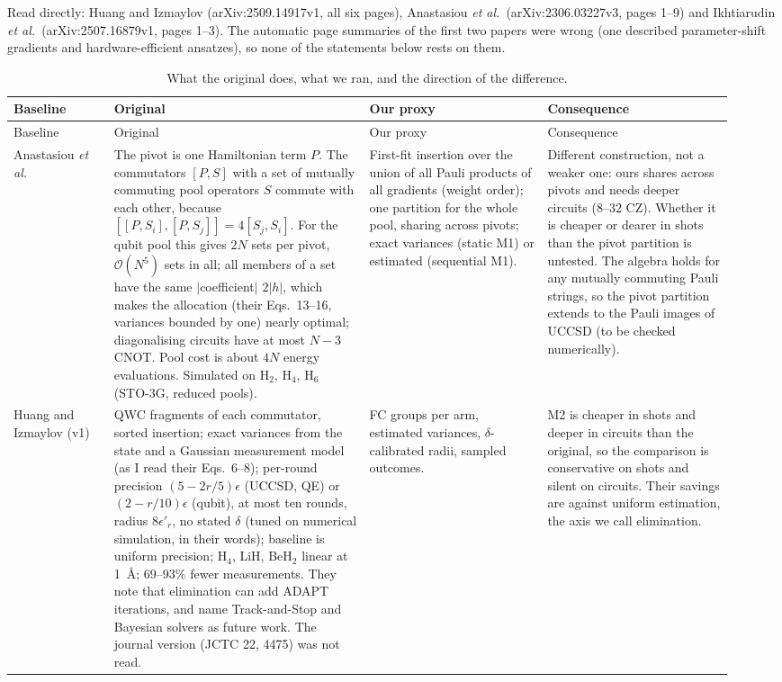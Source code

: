 \documentclass[11pt]{article}
\newcommand{\Hfour}{H$_4$}
\begin{document}
Read directly: Huang and Izmaylov (arXiv:2509.14917v1, all six pages), Anastasiou \emph{et al.}\ (arXiv:2306.03227v3, pages 1--9) and Ikhtiarudin \emph{et al.}\ (arXiv:2507.16879v1, pages 1--3). The automatic page summaries of the first two papers were wrong (one described parameter-shift gradients and hardware-efficient ansatzes), so none of the statements below rests on them.

\begingroup\small
\setlength{\tabcolsep}{4pt}
\begin{longtable}{>{\raggedright\arraybackslash}p{0.13\linewidth}>{\raggedright\arraybackslash}p{0.33\linewidth}>{\raggedright\arraybackslash}p{0.23\linewidth}>{\raggedright\arraybackslash}p{0.24\linewidth}}
\caption{What the original does, what we ran, and the direction of the difference.\label{tab:audit}}\\
\toprule
Baseline & Original & Our proxy & Consequence \\
\midrule
\endfirsthead
\toprule
Baseline & Original & Our proxy & Consequence \\
\midrule
\endhead
Anastasiou \emph{et al.} & The pivot is one Hamiltonian term $P$. The commutators $[P,S]$ with a set of mutually commuting pool operators $S$ commute with each other, because $[[P,S_i],[P,S_j]]=4[S_j,S_i]$. For the qubit pool this gives $2N$ sets per pivot, $\mathcal O(N^5)$ sets in all; all members of a set have the same $\lvert$coefficient$\rvert$ $2\lvert h\rvert$, which makes the allocation (their Eqs.~13--16, variances bounded by one) nearly optimal; diagonalising circuits have at most $N-3$ CNOT. Pool cost is about $4N$ energy evaluations. Simulated on H$_2$, \Hfour{}, H$_6$ (STO-3G, reduced pools). & First-fit insertion over the union of all Pauli products of all gradients (weight order); one partition for the whole pool, sharing across pivots; exact variances (static M1) or estimated (sequential M1). & Different construction, not a weaker one: ours shares across pivots and needs deeper circuits ($8$--$32$ CZ). Whether it is cheaper or dearer in shots than the pivot partition is untested. The algebra holds for any mutually commuting Pauli strings, so the pivot partition extends to the Pauli images of UCCSD (to be checked numerically). \\
Huang and Izmaylov (v1) & QWC fragments of each commutator, sorted insertion; exact variances from the state and a Gaussian measurement model (as I read their Eqs.~6--8); per-round precision $(5-2r/5)\epsilon$ (UCCSD, QE) or $(2-r/10)\epsilon$ (qubit), at most ten rounds, radius $8\epsilon'_r$, no stated $\delta$ (tuned on numerical simulation, in their words); baseline is uniform precision; \Hfour{}, LiH, BeH$_2$ linear at 1~\AA{}; $69$--$93\%$ fewer measurements. They note that elimination can add ADAPT iterations, and name Track-and-Stop and Bayesian solvers as future work. The journal version (JCTC 22, 4475) was not read. & FC groups per arm, estimated variances, $\delta$-calibrated radii, sampled outcomes. & M2 is cheaper in shots and deeper in circuits than the original, so the comparison is conservative on shots and silent on circuits. Their savings are against uniform estimation, the axis we call elimination. \\

\end{longtable}
\end{document}
